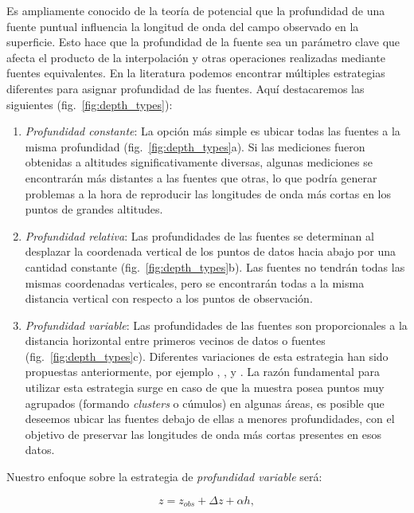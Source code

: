 Es ampliamente conocido de la teoría de potencial que la profundidad de una
fuente puntual influencia la longitud de onda del campo observado en la
superficie.
Esto hace que la profundidad de la fuente sea un parámetro clave que afecta el
producto de la interpolación y otras operaciones realizadas mediante fuentes
equivalentes.
En la literatura podemos encontrar múltiples estrategias diferentes para
asignar profundidad de las fuentes.
Aquí destacaremos las siguientes (fig.~\ref{fig:depth_types}):

\begin{enumerate}
  \item
    \emph{Profundidad constante}:
    La opción más simple es ubicar todas las fuentes a la misma profundidad
    (fig.~\ref{fig:depth_types}a).
    Si las mediciones fueron obtenidas a altitudes significativamente diversas,
    algunas mediciones se encontrarán más distantes a las fuentes que otras,
    lo que podría generar problemas a la hora de reproducir las longitudes de
    onda más cortas en los puntos de grandes altitudes.
 \item
    \emph{Profundidad relativa}:
    Las profundidades de las fuentes se determinan al desplazar la coordenada
    vertical de los puntos de datos hacia abajo por una cantidad constante
    (fig.~\ref{fig:depth_types}b).
    Las fuentes no tendrán todas las mismas coordenadas verticales, pero se
    encontrarán todas a la misma distancia vertical con respecto a los puntos
    de observación.
 \item
    \emph{Profundidad variable}:
    Las profundidades de las fuentes son proporcionales a la distancia
    horizontal entre primeros vecinos de datos o fuentes
    (fig.~\ref{fig:depth_types}c).
    Diferentes variaciones de esta estrategia han sido propuestas
    anteriormente, por ejemplo
    \citet{cordell1992}, \citet{guspi2004}, y \citet{guspi2009}.
    La razón fundamental para utilizar esta estrategia surge en caso de que la
    muestra posea puntos muy agrupados (formando \emph{clusters} o cúmulos) en
    algunas áreas, es posible que deseemos ubicar las fuentes debajo de ellas
    a menores profundidades, con el objetivo de preservar las longitudes de
    onda más cortas presentes en esos datos.
\end{enumerate}

Nuestro enfoque sobre la estrategia de \emph{profundidad variable} será:

\begin{equation}
  z = z_{obs} + \Delta z + \alpha h,
  \label{eq:variable_depth}
\end{equation}

